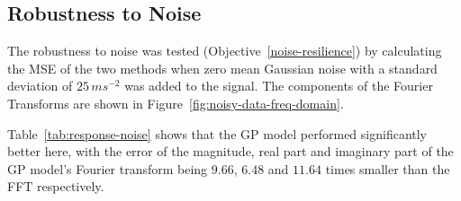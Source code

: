 \documentclass[12pt]{article}
\begin{document}
    \subsection{Robustness to Noise}
    The robustness to noise was tested (Objective~\ref{noise-resilience}) by calculating the MSE of the two methods when zero mean Gaussian noise with a standard deviation of $25 \, ms^{-2}$ was added to the signal.
    The components of the Fourier Transforms are shown in Figure~\ref{fig:noisy-data-freq-domain}.


    Table~\ref{tab:response-noise} shows that the GP model performed significantly better here, with the error of the magnitude, real part and imaginary part of the GP model's Fourier transform being $9.66$, $6.48$ and $11.64$ times smaller than the FFT respectively.
\end{document}
